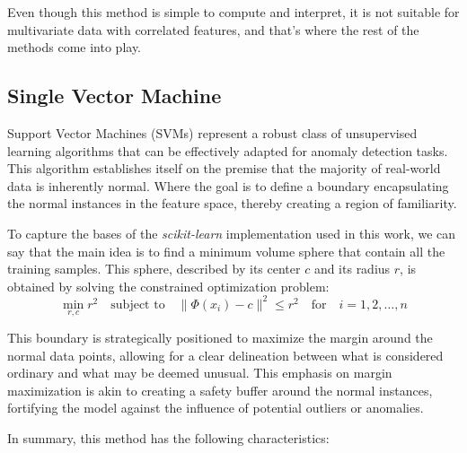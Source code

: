 \documentclass[11pt,english,a4paper,hidelinks]{book}
\begin{document}
\noindent Even though this method is simple to compute and interpret, it is not suitable for multivariate data with correlated features, and that's where the rest of the methods come into play.

\subsection{Single Vector Machine}

\noindent Support Vector Machines (SVMs) represent a robust class of unsupervised learning algorithms that can be effectively adapted for anomaly detection tasks. This algorithm establishes itself on the premise that the majority of real-world data is inherently normal. Where the goal is to define a boundary encapsulating the normal instances in the feature space, thereby creating a region of familiarity. 

\vspace{0.5cm}
\noindent To capture the bases of the \textit{scikit-learn} implementation \cite{scikit2025oneclasssvm} used in this work, we can say that the main idea is to find a minimum volume sphere that contain all the training samples. This sphere, described by its center \(c\) and its radius \(r\), is obtained by solving the constrained optimization problem: \cite{zineb2012simple}
\begin{equation}
\min_{r,c} r^2 \quad \text{subject to} \quad \|\Phi(x_i) - c\|^2 \leq r^2 \quad \text{for} \quad i = 1, 2, \ldots, n
\end{equation}

\vspace{0.5cm}
\noindent This boundary is strategically positioned to maximize the margin around the normal data points, allowing for a clear delineation between what is considered ordinary and what may be deemed unusual. This emphasis on margin maximization is akin to creating a safety buffer around the normal instances, fortifying the model against the influence of potential outliers or anomalies.

\vspace{0.5cm}
\noindent In summary, this method has the following characteristics:
\end{document}
